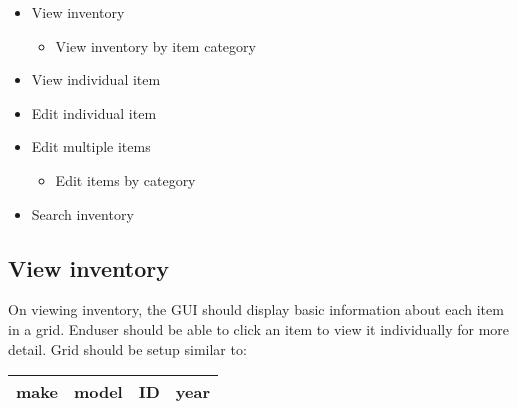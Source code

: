 \documentclass[titlepage]{article}
\begin{document}
            \begin{itemize}
                \item
                View inventory
                    \begin{itemize}
                        \item
                        View inventory by item category
                    \end{itemize}
                
                \item
                View individual item
                
                \item
                Edit individual item
                
                \item
                Edit multiple items
                    \begin{itemize}
                        \item
                        Edit items by category
                    \end{itemize}
                
                \item
                Search inventory
            \end{itemize}
            
            \subsection{View inventory}
                On viewing inventory, the GUI should display basic information about each item
                in a grid. Enduser should be able to click an item to view it individually for
                more detail. Grid should be setup similar to:
                
                \begin{tabular}{|l|l|l|l|} \hline
                    make & model & ID & year \\ \hline
                
                \end{tabular}
\end{document}
